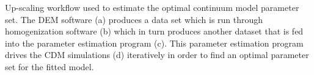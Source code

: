 \label{fig:workflow} Up-scaling workflow used to estimate the optimal continuum model parameter set. The DEM software (a) produces a data set which is run through homogenization software (b) which in turn produces another dataset that is fed into the parameter estimation program (c). This parameter estimation program drives the CDM simulations (d) iteratively in order to find an optimal parameter set for the fitted model.  
